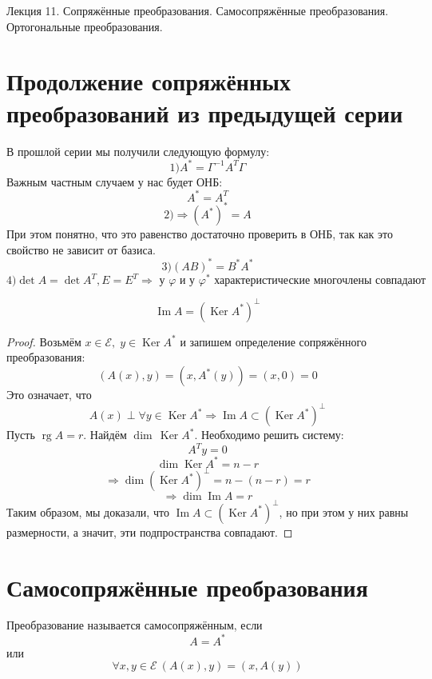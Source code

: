 \documentclass[11pt]{article}
\DeclareMathOperator{\Imm}{Im}
\DeclareMathOperator{\rg}{rg}
\DeclareMathOperator{\Ker}{Ker}
\begin{document}
\begin{titlepage}
    \centering
    \vspace*{\fill}  %

    {\Huge Лекция 11. Сопряжённые преобразования. Самосопряжённые преобразования. Ортогональные преобразования.
    \par}

    \vspace*{\fill}  %
\end{titlepage}

\setcounter{page}{1}

\section{Продолжение сопряжённых преобразований из предыдущей серии}
В прошлой серии мы получили следующую формулу:
\[ 1) A^* = \Gamma^{-1} A^T \Gamma \]
Важным частным случаем у нас будет ОНБ:
\[ A^* = A^T \]
\[ 2) \Rightarrow (A^*)^* = A \]
При этом понятно, что  это равенство достаточно проверить в ОНБ, так как это свойство не зависит от базиса.
\[ 3) (AB)^* = B^* A^* \]
\[ 4) \det A = \det A^T, E=E^T \Rightarrow \text{ у } \varphi \text{ и у }\varphi^* \text{ характеристические многочлены совпадают} \]

\begin{theorem}
    \[ \Imm A = (\Ker A^*) ^\perp \]
\end{theorem}

\begin{proof}
    Возьмём $x\in \mathcal{E}, \; y\in \Ker A^*$ и запишем определение сопряжённого преобразования:
    \[ (A(x),y) = (x, A^*(y)) = (x,0) = 0 \]
    Это означает, что
    \[ A(x) \perp \forall y\in \Ker A^* \Rightarrow \Imm A \subset (\Ker A^*)^\perp \]
    Пусть $\rg A = r$. Найдём $\dim\, \Ker  A^*$. Необходимо решить систему:
    \[ A^T y =0  \]
    \[ \dim \Ker  A^* = n -r \]
    \[ \Rightarrow \dim (\Ker A^*)^\perp = n - (n-r) = r \]   
    \[ \Rightarrow \dim \Imm A = r \]
    Таким образом, мы доказали, что $ \Imm A \subset (\Ker A^*)^\perp$, но при этом у них равны размерности, а значит, эти подпространства совпадают.
\end{proof}

\section{Самосопряжённые преобразования}
 
\begin{definition}
    Преобразование называется самосопряжённым, если 
    \[ A = A^* \]
    или 
    \[ \forall x, y\in \mathcal{E} \ (A(x),y) = (x,A(y)) \]
\end{definition}
\end{document}
